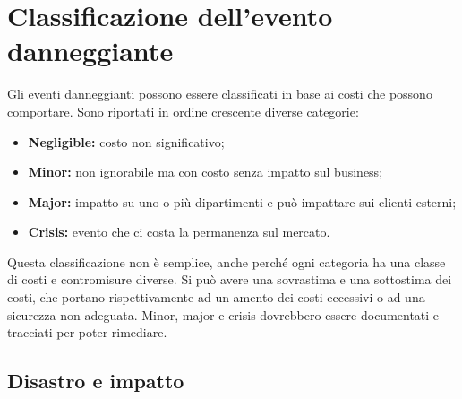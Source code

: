 \section{Classificazione dell'evento danneggiante}

Gli eventi danneggianti possono essere classificati in base ai costi
che possono comportare. Sono riportati in ordine crescente diverse categorie:

\begin{itemize}
\item \textbf{Negligible:} costo non significativo;
\item \textbf{Minor:} non ignorabile ma con costo senza impatto sul business;
\item \textbf{Major:} impatto su uno o più dipartimenti e può impattare sui clienti esterni;
\item \textbf{Crisis:} evento che ci costa la permanenza sul mercato.
\end{itemize}

Questa classificazione non è semplice, anche perché ogni categoria ha una
classe di costi e contromisure diverse. Si può avere una sovrastima e una
sottostima dei costi, che portano rispettivamente ad un amento dei costi
eccessivi o ad una sicurezza non adeguata.
Minor, major e crisis dovrebbero essere documentati e tracciati per poter
rimediare.

\subsection{Disastro e impatto}

